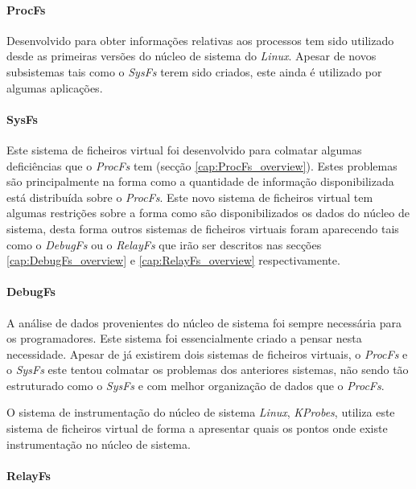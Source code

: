 \paragraph*{ProcFs}\label{cap:ProcFs_overview}

Desenvolvido para obter informações relativas aos processos tem sido utilizado desde as primeiras versões do núcleo de sistema do \textit{Linux}. Apesar de novos subsistemas tais como o \textit{SysFs} terem sido criados, este ainda é utilizado por algumas aplicações.

\paragraph*{SysFs}\label{cap:SysFs_overview}

Este sistema de ficheiros virtual foi desenvolvido para colmatar algumas deficiências que o \textit{ProcFs} tem (secção \ref{cap:ProcFs_overview}). Estes problemas são principalmente na forma como a quantidade de informação disponibilizada está distribuída sobre o \textit{ProcFs}. Este novo sistema de ficheiros virtual tem algumas restrições sobre a forma como são disponibilizados os dados do núcleo de sistema, desta forma outros sistemas de ficheiros virtuais foram aparecendo tais como o \textit{DebugFs} ou o \textit{RelayFs} que irão ser descritos nas secções \ref{cap:DebugFs_overview} e \ref{cap:RelayFs_overview} respectivamente.

\paragraph*{DebugFs}\label{cap:DebugFs_overview}

A análise de dados provenientes do núcleo de sistema foi sempre necessária para os programadores. Este sistema foi essencialmente criado a pensar nesta necessidade. Apesar de já existirem dois sistemas de ficheiros virtuais, o \textit{ProcFs} e o \textit{SysFs} este tentou colmatar os problemas dos anteriores sistemas, não sendo tão estruturado como o \textit{SysFs} e com melhor organização de dados que o \textit{ProcFs}.

O sistema de instrumentação do núcleo de sistema \textit{Linux}, \textit{KProbes}, utiliza este sistema de ficheiros virtual de forma a apresentar quais os pontos onde existe instrumentação no núcleo de sistema.

\paragraph*{RelayFs}\label{cap:RelayFs_overview}

